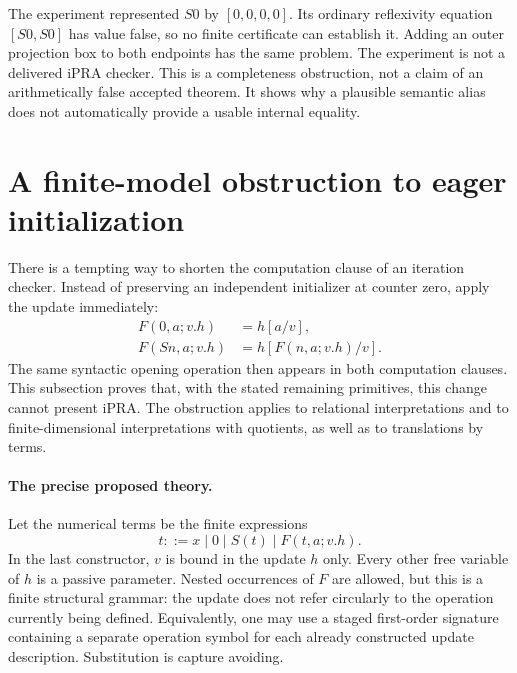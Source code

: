 \documentclass[11pt,letterpaper]{article}
\theoremstyle{definition}\newtheorem{definition}[theorem]{Definition}
\theoremstyle{remark}\newtheorem{remark}[theorem]{Remark}
\begin{document}
The experiment represented $S0$ by $[0,0,0,0]$. Its ordinary reflexivity
equation $[S0,S0]$ has value false, so no finite certificate can establish
it. Adding an outer projection box to both endpoints has the same
problem. The experiment is not a delivered iPRA checker. This is a
completeness obstruction, not a claim of an arithmetically false accepted
theorem. It shows why a plausible semantic alias does not automatically
provide a usable internal equality.



\section{A finite-model obstruction to eager initialization}
\label{sec:eager-obstruction}

There is a tempting way to shorten the computation clause of an iteration
checker.  Instead of preserving an independent initializer at counter zero,
apply the update immediately:
\begin{align}
 F(0,a;v.h)&=h[a/v],\label{eq:eager-zero}\\
 F(Sn,a;v.h)&=h[F(n,a;v.h)/v].\label{eq:eager-step}
\end{align}
The same syntactic opening operation then appears in both computation
clauses.  This subsection proves that, with the stated remaining
primitives, this change cannot present iPRA.  The obstruction applies to
relational interpretations and to finite-dimensional interpretations with
quotients, as well as to translations by terms.

\paragraph{The precise proposed theory.}
Let the numerical terms be the finite expressions
\[
 t ::= x\mid 0\mid S(t)\mid F(t,a;v.h).
\]
In the last constructor, $v$ is bound in the update $h$ only.  Every other
free variable of $h$ is a passive parameter.  Nested occurrences of $F$
are allowed, but this is a finite structural grammar: the update does not
refer circularly to the operation currently being defined.  Equivalently,
one may use a staged first-order signature containing a separate operation
symbol for each already constructed update description.  Substitution is
capture avoiding.
\end{document}
